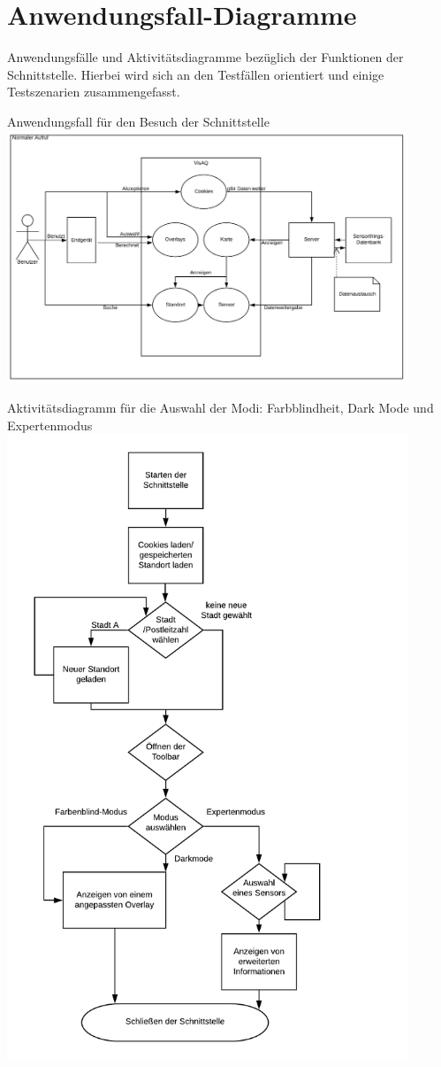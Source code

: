\section{Anwendungsfall-Diagramme}
Anwendungsfälle und Aktivitätsdiagramme bezüglich der Funktionen der Schnittstelle. Hierbei wird sich an den Testfällen orientiert und einige Testszenarien zusammengefasst.

Anwendungsfall für den Besuch der Schnittstelle
\includegraphics[width=0.9\textwidth]{media/Anwendungsfall1} 

Aktivitätsdiagramm für die Auswahl der Modi: Farbblindheit, Dark Mode und Expertenmodus
\includegraphics[width=0.9\textwidth]{media/AuswahlModi} 

